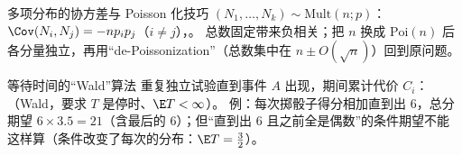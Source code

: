 \begin{结论}{多项分布的协方差与 Poisson 化技巧}
$(N_1,\dots,N_k)\sim\mathrm{Mult}(n;p)$：$\Cov(N_i,N_j)=-np_ip_j$（$i\ne j$），。
总数固定带来负相关；把 $n$ 换成 $\mathrm{Poi}(n)$ 后各分量独立，再用“de-Poissonization”（总数集中在 $n\pm O(\sqrt n)$）回到原问题。
\end{结论}

\begin{结论}{等待时间的“Wald”算法}
重复独立试验直到事件 $A$ 出现，期间累计代价 $C_i$：（Wald，要求 $T$ 是停时、$\E T<\infty$）。
例：每次掷骰子得分相加直到出 $6$，总分期望 $6\times3.5=21$（含最后的 $6$）；但“直到出 $6$ 且之前全是偶数”的条件期望不能这样算（条件改变了每次的分布：$\E T=\frac32$）。
\end{结论}

